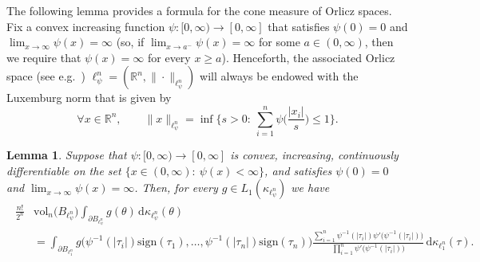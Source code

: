 \documentclass[11pt,reqno]{amsart}
\renewcommand{\le}{\leqslant}
\renewcommand{\ge}{\geqslant}
\newcommand{\ud}[0]{\,\mathrm{d}}
\newcommand{\sign}{\mathrm{sign}}
\newcommand{\X}{\mathbf X}
\newcommand{\Y}{\mathbf Y}
\newcommand{\R}{\mathbb R}
\newtheorem{lemma}[theorem]{Lemma}
\theoremstyle{remark}
\newcommand{\iq}{\mathrm{iq}}
\newcommand{\bfZ}{\mathbf{Z}}
\newcommand{\vol}{\mathrm{vol}}
\renewcommand{\1}{\mathbf 1}
\begin{document}

The following lemma provides  a formula for the cone measure of Orlicz spaces. Fix a convex increasing function $\psi:[0,\infty)\to [0,\infty]$ that satisfies $\psi(0)=0$ and $\lim_{x\to \infty} \psi(x)=\infty$ (so, if $\lim_{x\to a^{-}} \psi(x)=\infty$ for some $a\in (0,\infty)$, then we require that $\psi(x)=\infty$ for every $x\ge a$). Henceforth, the associated Orlicz space (see e.g.~\cite{RaoRen91})  $\ell_\psi^n=(\R^n,\|\cdot\|_{\ell_{\psi}^n})$  will always be endowed with the Luxemburg norm that is given by
\begin{equation}\label{eq:define luxemburg}
\forall x\in \R^n,\qquad \|x\|_{\ell_\psi^n}=\inf\bigg\{s>0:\ \sum_{i=1}^n \psi\Big(\frac{|x_i|}{s}\Big)\le 1\bigg\}.
\end{equation}




\begin{lemma}\label{lem:orlicz} Suppose that $\psi:[0,\infty)\to [0,\infty]$ is convex, increasing, continuously differentiable on the set $\{x\in (0,\infty):\ \psi(x)<\infty\}$, and satisfies $\psi(0)=0$ and $\lim_{x\to \infty} \psi(x)=\infty$. Then, for every $g\in L_1(\kappa_{\ell_{\psi}^n})$ we have
\begin{align}\label{eq:orlicz change of variable-with const}
\begin{split}
\frac{n!}{2^n}&\vol_n\big(B_{\ell_{\psi}^n}\big)\int_{\partial B_{\ell_{\psi}^n}}  g(\theta) \ud \kappa_{\ell_{\psi}^n}(\theta)\\&=\int_{\partial B_{\ell_1^n}} g\big(\psi^{-1}(|\tau_i|)\sign(\tau_1),\ldots,\psi^{-1}(|\tau_n|)\sign(\tau_n)\big) \frac{\sum_{i=1}^n \psi^{-1}(|\tau_i|)\psi'\big(\psi^{-1}(|\tau_i|)\big)}{\prod_{i=1}^n\psi'\big(\psi^{-1}(|\tau_i|)\big)}\ud \kappa_{\ell_1^n}(\tau).
\end{split}
\end{align}
\end{lemma}
\end{document}

